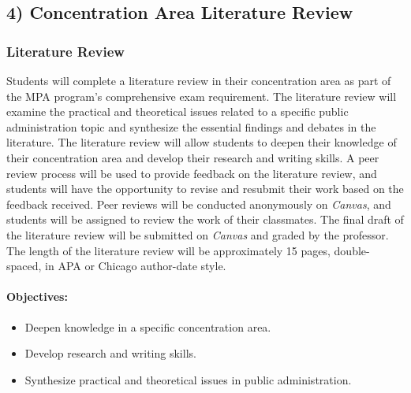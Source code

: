 \documentclass[12pt, letterpaper]{article}
\begin{document}
\subsection*{4) Concentration Area Literature Review}

\subsubsection*{Literature Review}

Students will complete a literature review in their concentration area as part of the MPA program's comprehensive exam requirement. The literature review will examine the practical and theoretical issues related to a specific public administration topic and synthesize the essential findings and debates in the literature. The literature review will allow students to deepen their knowledge of their concentration area and develop their research and writing skills. A peer review process will be used to provide feedback on the literature review, and students will have the opportunity to revise and resubmit their work based on the feedback received. Peer reviews will be conducted anonymously on \emph{Canvas}, and students will be assigned to review the work of their classmates. The final draft of the literature review will be submitted on \emph{Canvas} and graded by the professor. The length of the literature review will be approximately 15 pages, double-spaced, in APA or Chicago author-date style.

\paragraph*{Objectives:}
\begin{itemize}
    \item Deepen knowledge in a specific concentration area.
    \item Develop research and writing skills.
    \item Synthesize practical and theoretical issues in public administration.
\end{itemize}
\end{document}
